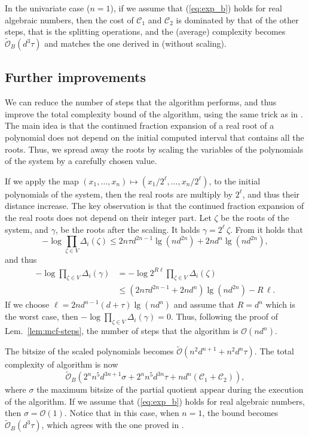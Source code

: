 \documentclass{sig-alternate}
\newcommand{\OO}{\ensuremath{\mathcal{O}}\xspace}
\newcommand{\sO}{\ensuremath{\widetilde{\mathcal{O}}}\xspace}
\newcommand{\sOB}{\ensuremath{\widetilde{\mathcal{O}}_B}\xspace}
\begin{document}
In the univariate case ($n=1$),
if we assume that (\ref{eq:exp_b}) holds for real algebraic numbers, 
then the cost of $\mathcal{C}_1$ and $\mathcal{C}_2$
is dominated by that of the other steps, that is the splitting operations, 
and the (average) complexity becomes $\sOB(d^3 \tau)$
and matches the one derived in \cite{et-tcs-2007}
(without scaling). 


\subsection{Further improvements}
\label{sec:complexity-improvements}

We can reduce the number of steps that the algorithm performs, and thus improve
the total complexity bound of the algorithm, using the same trick as in
\cite{et-tcs-2007}.
The main idea is that the continued fraction expansion of a real root of a
polynomial does not depend on the initial computed interval that contains all
the roots.
Thus, we spread away the roots by scaling the variables of the polynomials of the
system by a carefully chosen value.

If we apply the map 
$(x_1, \dots, x_n) \mapsto (x_1/2^{\ell}, \dots, x_n/2^{\ell})$, to the initial
polynomials of the system, then the real roots are multiply by $2^{\ell}$, and
thus their distance increase.
The key observation is that the continued fraction expansion of the real roots
does not depend on their integer part.
Let $\zeta$ be the roots of the system, and $\gamma$, be the roots after the
scaling. It holds $\gamma =2^{\ell}\, \zeta$.
From \cite{emt-dmm-2009} it holds that 
\begin{displaymath}
  -\log{ \prod_{\zeta\in V}{\Delta_{i}(\zeta)}} 
  \leq  2n\tau d^{2n-1} \lg( n d^{2n})  + 2 n  d^{n} \lg( n d^{2n}),
\end{displaymath}
and thus
\begin{align*}-\log{ \prod_{\zeta\in V}{\Delta_{i}(\gamma)}} 
    & =  
    -\log{ 2^{R \ell}  \prod_{\zeta\in V}{\Delta_{i}(\zeta)}}  \\
    & \leq 
    (2n\tau d^{2n-1} + 2 n  d^{n}) \lg( n d^{2n}) - R \,\ell.
  \end{align*}
If we choose $\ell = 2n d^{n-1}(d + \tau)\lg( n d^n)$
and assume that $R = d^{n}$ which is the worst case, then 
$-\log{ \prod_{\zeta\in V}{\Delta_{i}(\gamma)}}= 0$.
Thus, following the proof of Lem.~\ref{lem:mcf-steps},
the number of steps that the algorithm is $\OO( n d^n)$.

The bitsize of the scaled polynomials becomes
$\sO( n^2 d^{n+1} + n^2 d^{n} \tau)$.
The total complexity of algorithm is now
$$\sOB( 2^n n^5 d^{3n+1} \sigma + 2^{n} n^5 d^{3n} \tau 
+ n d^n( \mathcal{C}_1 + \mathcal{C}_2)),$$
where $\sigma$ the maximum bitsize of the partial quotient
appear during the execution of the algorithm.
If we assume that (\ref{eq:exp_b}) holds for real algebraic numbers, 
then $\sigma = \OO(1)$. Notice that in
this case, when $n=1$, the bound becomes $\sOB( d^3 \tau)$, which agrees with
the one proved in \cite{et-tcs-2007}.
\end{document}
